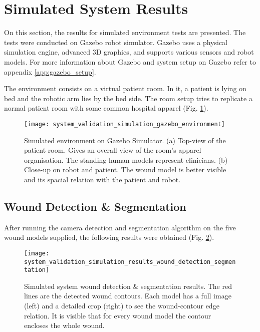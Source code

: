 

\section{Simulated System Results}
\label{sec:system_validation_simulation_results}

On this section, the results for simulated environment tests are presented. The tests were conducted on Gazebo robot simulator. Gazebo uses a physical simulation engine, advanced 3D graphics, and supports various sensors and robot models. For more information about Gazebo and system setup on Gazebo refer to appendix \ref{app:gazebo_setup}.

The environment consists on a virtual patient room. In it, a patient is lying on bed and the robotic arm lies by the bed side. The room setup tries to replicate a normal patient room with some common hospital apparel (Fig. \ref{fig:system_validation_simulation_gazebo_environment}).

\begin{figure}[htbp]
	\centering
	\texttt{[image: system\_validation\_simulation\_gazebo\_environment]}
	\caption{Simulated environment on Gazebo Simulator. (a) Top-view of the patient room. Gives an overall view of the room's apparel organisation. The standing human models represent clinicians. (b) Close-up on robot and patient. The wound model is better visible and its spacial relation with the patient and robot.}
	\label{fig:system_validation_simulation_gazebo_environment}
\end{figure}

\subsection{Wound Detection \& Segmentation}
\label{subsec:simulated_system_results_wound_detection_segmentation}

After running the camera detection and segmentation algorithm on the five wound models supplied, the following results were obtained (Fig. \ref{fig:system_validation_simulation_results_wound_detection_segmentation}).\\

\begin{figure}[htbp]
	\centering
	\texttt{[image: system\_validation\_simulation\_results\_wound\_detection\_segmentation]}
	\caption{Simulated system wound detection \& segmentation results. The red lines are the detected wound contours. Each model has a full image (left) and a detailed crop (right) to see the wound-contour edge relation. It is visible that for every wound model the contour encloses the whole wound.}
	\label{fig:system_validation_simulation_results_wound_detection_segmentation}
\end{figure}

